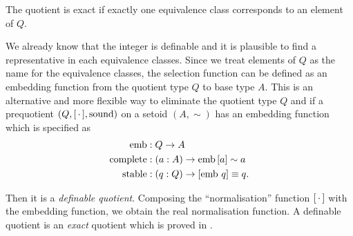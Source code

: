 The quotient is exact if exactly one equivalence class corresponds to
an element of $Q$.

We already know that the integer is definable and it is plausible to
find a representative in each equivalence classes. Since
we treat elements of $Q$ as the name for the equivalence classes, the
selection function can be defined as an embedding function from  the
quotient type $Q$ to base type $A$. This is an alternative and more
flexible way to eliminate the quotient type $Q$ and if a
prequotient $(Q, [\,\cdot\,], \operatorname{sound})$ on a setoid $(A,\sim)$ has
an embedding function which is specified as
\begin{align*}
\operatorname{emb} &: Q \rightarrow A\\
\operatorname{complete} &: (a : A) \rightarrow \operatorname{emb} {[a]} \sim a\\
\operatorname{stable} &: (q:Q) \rightarrow [\operatorname{emb}\,q] \equiv q.\\
\end{align*}

Then it is a \emph{definable quotient}. Composing the ``normalisation'' function $[\,\cdot\,]$ with the
embedding function, we obtain the real normalisation function. A
definable quotient is an \emph{exact} quotient which is proved in \cite{aan}.


